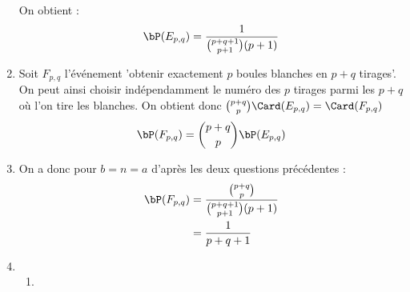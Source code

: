 \begin{correction}
\begin{enumerate}
On obtient :
$$\bP(E_{p,q}) =  \frac{1}{\binom{p+q+1}{p+1}(p+1)} $$

\item Soit $F_{p,q}$ l'événement 'obtenir exactement $p$ boules blanches en $p+q$ tirages'. On peut ainsi choisir indépendamment le numéro des $p$  tirages parmi les $p+q$ où l'on tire les blanches. On obtient donc $\binom{p+q}{p}\Card(E_{p,q})  =\Card(F_{p,q})$
$$\bP(F_{p,q}) = \binom{p+q}{p}\bP(E_{p,q})$$

\item 
 On a donc pour $b=n=a$ d'après les deux questions précédentes : 
 \begin{align*}
 \bP(F_{p,q})  & =  \frac{\binom{p+q}{p}}{\binom{p+q+1}{p+1}(p+1)}  \\
 					&= \frac{1}{p+q+1 }
 \end{align*}
 
 \item \begin{enumerate}
 \item 
  
 \end{enumerate}
\end{enumerate}
\end{correction}